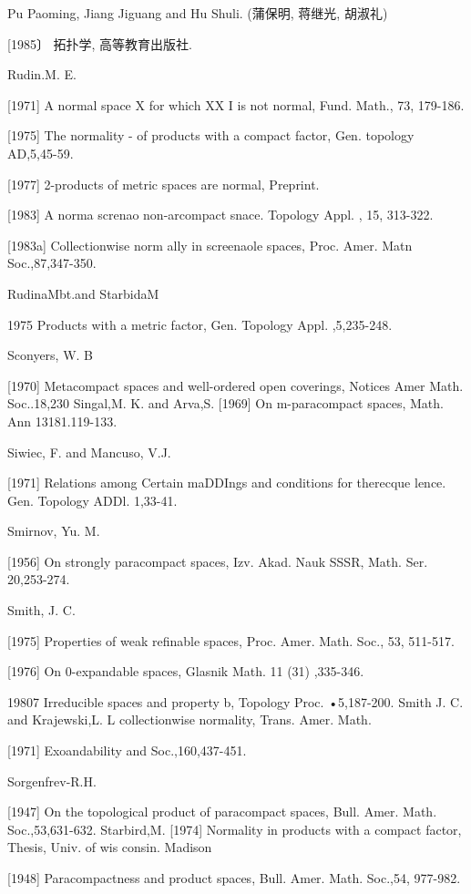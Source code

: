 \documentclass[main.tex]{subfiles}
\begin{document}
{\noindent Pu Paoming, Jiang Jiguang and Hu Shuli. (蒲保明, 蒋继光, 胡淑礼)
	
	[1985〕 拓扑学, 高等教育出版社.

\noindent Rudin.M. E.

[1971]
	A normal space X for which XX I is not normal, Fund. Math., 73, 179-186.

[1975] The normality
	- of products with a compact
	factor, Gen. topology AD,5,45-59.

[1977]
	2-products of metric spaces are normal, Preprint.

[1983]
A norma screnao non-arcompact
snace. Topology
Appl. , 15,
313-322.

[1983a]
Collectionwise
norm
ally in screenaole spaces, Proc. Amer. Matn
Soc.,87,347-350.

RudinaMbt.and StarbidaM

1975 Products with a metric factor, Gen. Topology Appl. ,5,235-248.

Sconyers, W. B

[1970]
Metacompact spaces and well-ordered open coverings, Notices Amer
Math. Soc..18,230
Singal,M. K. and Arva,S.
[1969]
On m-paracompact spaces, Math. Ann
13181.119-133.

Siwiec, F. and Mancuso, V.J.

[1971]
Relations among
Certain maDDIngs and
conditions for therecque
lence. Gen. Topology ADDl. 1,33-41.

Smirnov, Yu. M.

[1956]
On strongly paracompact spaces, Izv. Akad. Nauk SSSR, Math. Ser.
20,253-274.

Smith, J. C.

[1975] Properties of weak refinable spaces, Proc. Amer. Math. Soc., 53,
511-517.

[1976] On 0-expandable spaces, Glasnik Math. 11 (31) ,335-346.

19807 Irreducible spaces and property b, Topology Proc.
•5,187-200.
Smith J. C. and Krajewski,L. L
collectionwise normality, Trans. Amer. Math.

[1971]
Exoandability and
Soc.,160,437-451.

Sorgenfrev-R.H.

[1947]
On the topological product of paracompact spaces, Bull. Amer. Math.
Soc.,53,631-632.
Starbird,M.
[1974]
Normality in products with a compact factor, Thesis, Univ. of wis
consin. Madison

[1948]
Paracompactness and product spaces, Bull. Amer. Math. Soc.,54,
977-982.

}
\end{document}
